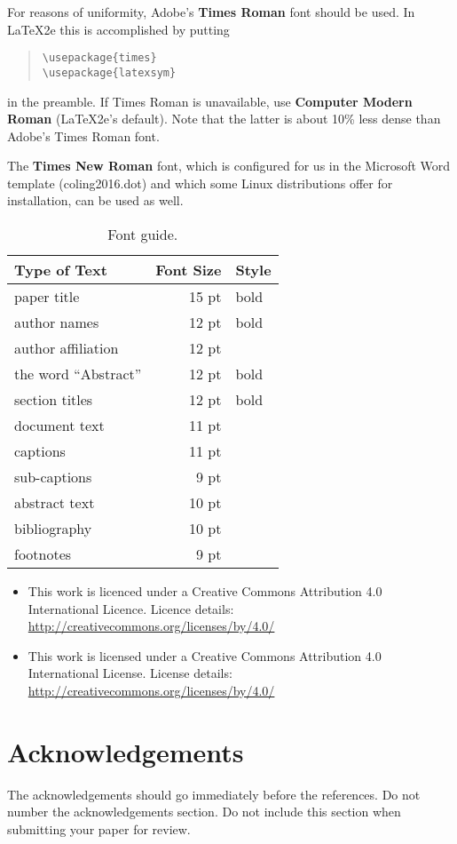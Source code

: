 \documentclass[11pt]{article}
\begin{document}
For reasons of uniformity, Adobe's {\bf Times Roman} font should be
used. In \LaTeX2e{} this is accomplished by putting

\begin{quote}
\begin{verbatim}
\usepackage{times}
\usepackage{latexsym}
\end{verbatim}
\end{quote}
in the preamble. If Times Roman is unavailable, use {\bf Computer
  Modern Roman} (\LaTeX2e{}'s default).  Note that the latter is about
  10\% less dense than Adobe's Times Roman font.

The {\bf Times New Roman} font, which is configured for us in the
Microsoft Word template (coling2016.dot) and which some Linux
distributions offer for installation, can be used as well.

\begin{table}[h]
\begin{center}
\begin{tabular}{|l|rl|}
\hline \bf Type of Text & \bf Font Size & \bf Style \\ \hline
paper title & 15 pt & bold \\
author names & 12 pt & bold \\
author affiliation & 12 pt & \\
the word ``Abstract'' & 12 pt & bold \\
section titles & 12 pt & bold \\
document text & 11 pt  &\\
captions & 11 pt & \\
sub-captions & 9 pt & \\
abstract text & 10 pt & \\
bibliography & 10 pt & \\
footnotes & 9 pt & \\
\hline
\end{tabular}
\end{center}
\caption{\label{font-table} Font guide. }
\end{table}

\begin{itemize}
    \item  This work is licenced under a Creative Commons Attribution 4.0 International Licence. Licence details: \url{http://creativecommons.org/licenses/by/4.0/}
           
    \item This work is licensed under a Creative Commons Attribution 4.0 International License. License details: \url{http://creativecommons.org/licenses/by/4.0/}
           
           
           
\end{itemize}

\section*{Acknowledgements}

The acknowledgements should go immediately before the references.  Do
not number the acknowledgements section. Do not include this section
when submitting your paper for review.

\printbibliography
\end{document}
